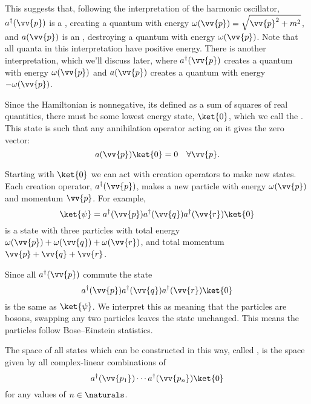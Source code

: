 \documentclass[fleqn]{NotesClass}
\newcommand{\hermit}{{\dagger}}
\begin{document}
    This suggests that, following the interpretation of the harmonic oscillator, \(a^\hermit(\vv{p})\) is a , creating a quantum with energy \(\omega(\vv{p}) = \sqrt{\vv{p}^2 + m^2}\), and \(a(\vv{p})\) is an , destroying a quantum with energy \(\omega(\vv{p})\).
    Note that all quanta in this interpretation have positive energy.
    There is another interpretation, which we'll discuss later, where \(a^\hermit(\vv{p})\) creates a quantum with energy \(\omega(\vv{p})\) and \(a(\vv{p})\) creates a quantum with energy \(-\omega(\vv{p})\).
    
    Since the Hamiltonian is nonnegative, its defined as a sum of squares of real quantities, there must be some lowest energy state, \(\ket{0}\), which we call the .
    This state is such that any annihilation operator acting on it gives the zero vector:
    \begin{equation}
        a(\vv{p}) \ket{0} = 0 \quad \forall \vv{p}.
    \end{equation}
    
    Starting with \(\ket{0}\) we can act with creation operators to make new states.
    Each creation operator, \(a^\hermit(\vv{p})\), makes a new particle with energy \(\omega(\vv{p})\) and momentum \(\vv{p}\).
    For example, 
    \begin{equation}
        \ket{\psi} = a^\hermit(\vv{p}) a^\hermit(\vv{q}) a^\hermit(\vv{r}) \ket{0}
    \end{equation}
    is a state with three particles with total energy \(\omega(\vv{p}) + \omega(\vv{q}) + \omega(\vv{r})\), and total momentum \(\vv{p} + \vv{q} + \vv{r}\).
    
    Since all \(a^\hermit(\vv{p})\) commute the state
    \begin{equation}
        a^\hermit(\vv{p}) a^\hermit(\vv{q}) a^\hermit(\vv{r}) \ket{0}
    \end{equation}
    is the same as \(\ket{\psi}\).
    We interpret this as meaning that the particles are bosons, swapping any two particles leaves the state unchanged.
    This means the particles follow Bose--Einstein statistics.
    
    The space of all states which can be constructed in this way, called , is the space given by all complex-linear combinations of
    \begin{equation}
        a^\hermit(\vv{p_1}) \dotsm a^\hermit(\vv{p_n})\ket{0}
    \end{equation}
    for any values of \(n \in \naturals\).
    
\end{document}
